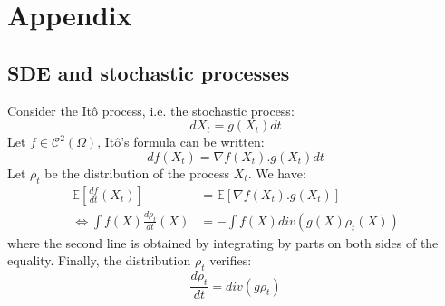 \documentclass{article}
\newcommand{\1}{\mathbbm 1}
\newcommand{\E}{{{\mathbb E}}}
\theoremstyle{definition}
\begin{document}
\newpage
\section{Appendix}

\subsection{SDE and stochastic processes}

Consider the Itô process, i.e. the stochastic process:
\begin{equation}
dX_t=g(X_t)dt
\end{equation}
Let $f \in \mathcal{C}^2(\Omega)$, Itô's formula can be written:
\begin{equation*}
df(X_t)=\nabla f(X_t).g(X_t)dt
\end{equation*}
Let $\rho_t$ be the distribution of the process $X_t$. We have:
\begin{align*}
\E[\frac{df}{dt}(X_t)]&= \E[\nabla f(X_t).g(X_t)]\\
\Longleftrightarrow \int f(X) \frac{d \rho_t}{dt}(X)&=-\int f(X)div(g(X)\rho_t(X))
\end{align*}
where the second line is obtained by integrating by parts on both sides of the equality. Finally, the distribution $\rho_t$ verifies: 
\begin{equation*}
\frac{d\rho_t}{dt}=div(g\rho_t)
\end{equation*}
\end{document}
